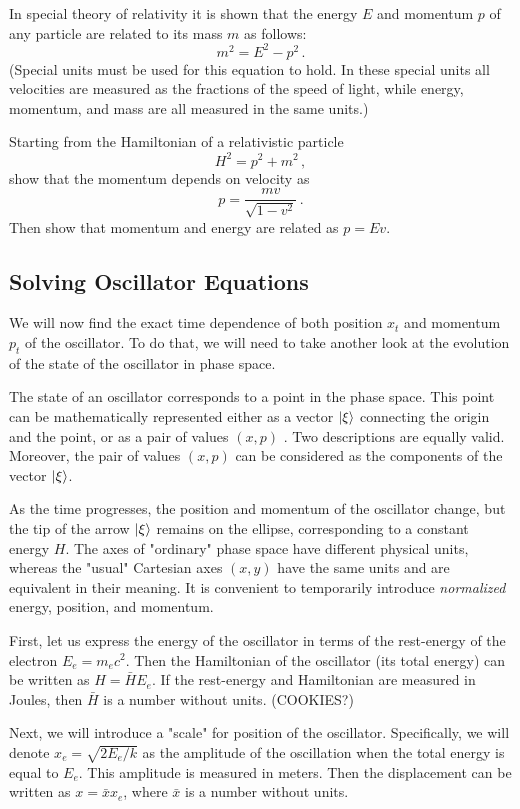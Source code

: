 \begin{exercise}
	In special theory of relativity it is shown that the energy $E$ and momentum $p$ of any particle are related to its mass $m$ as follows:
	\[
	m^2=E^2-p^2\,.
	\]
	(Special units must be used for this equation to hold. In these special units all velocities are measured as the fractions of the speed of light, while energy, momentum, and mass are all measured in the same units.)
	
	Starting from the Hamiltonian of a relativistic particle 
	\[
	H^2=p^2+m^2\,,
	\]
	show that the momentum depends on velocity as
	\[
	p=\frac{mv}{\sqrt{1-v^2}}\,.
	\]
	Then show that momentum and energy are related as $p=Ev$.
\end{exercise}

\subsection{Solving Oscillator Equations}
We will now find the exact time dependence of both position $x_t$ and momentum $p_t$ of the oscillator. To do that, we will need to take another look at the evolution of the state of the oscillator in phase space.

The state of an oscillator corresponds to a point in the phase space. This point can be mathematically represented either as a vector $|{\xi}\rangle$ connecting the origin and the point, or as a pair of values $(x,p)$ . Two descriptions are equally valid. Moreover, the pair of values $(x,p)$  can be considered as the components of the vector $|{\xi}\rangle$. 

As the time progresses, the position and momentum of the oscillator change, but the tip of the arrow $|{\xi}\rangle$ remains on the ellipse, corresponding to a constant energy $H$. The axes of "ordinary" phase space have different physical units, whereas the "usual" Cartesian axes $(x,y)$ have the same units and are equivalent in their meaning. It is convenient to temporarily introduce \emph{normalized} energy, position, and momentum.

First, let us express the energy of the oscillator in terms of the rest-energy of the electron $E_e=m_e c^2$. Then the Hamiltonian of the oscillator (its total energy) can be written as $H=\bar{H}E_e$. If the rest-energy and Hamiltonian are measured in Joules, then $\bar{H}$ is a number without units. (COOKIES?)

Next, we will introduce a "scale" for position of the oscillator. Specifically, we will denote $x_e=\sqrt{2E_e/k}$ as the amplitude of the oscillation when the total energy is equal to $E_e$. This amplitude is measured in meters. Then the displacement can be written as $x=\bar{x}x_e$, where $\bar{x}$ is a number without units.

